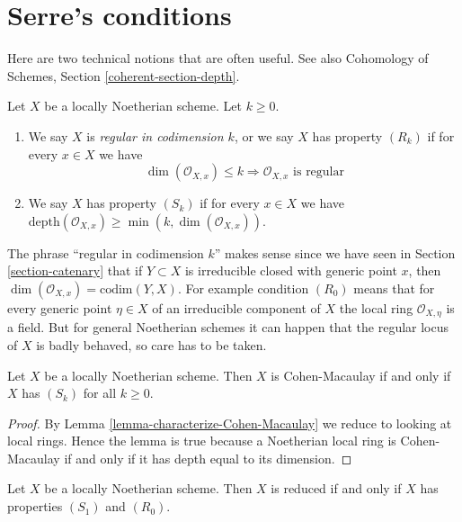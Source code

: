 \section{Serre's conditions}
\label{section-Rk}

\noindent
Here are two technical notions that are often useful.
See also Cohomology of Schemes, Section \ref{coherent-section-depth}.

\begin{definition}
\label{definition-Rk}
Let $X$ be a locally Noetherian scheme. Let $k \geq 0$.
\begin{enumerate}
\item We say $X$ is {\it regular in codimension $k$},
or we say $X$ has property {\it $(R_k)$} if for every $x \in X$
we have
$$
\dim(\mathcal{O}_{X, x}) \leq k
\Rightarrow
\mathcal{O}_{X, x}\text{ is regular}
$$
\item We say $X$ has property {\it $(S_k)$} if for every $x \in X$ we have
$\text{depth}(\mathcal{O}_{X, x}) \geq \min(k, \dim(\mathcal{O}_{X, x}))$.
\end{enumerate}
\end{definition}

\noindent
The phrase ``regular in codimension $k$'' makes sense since we have seen
in Section \ref{section-catenary} that if $Y \subset X$ is irreducible
closed with generic point $x$, then
$\dim(\mathcal{O}_{X, x}) = \text{codim}(Y, X)$. For example condition
$(R_0)$ means that for every generic point $\eta \in X$ of an irreducible
component of $X$ the local ring $\mathcal{O}_{X, \eta}$ is a field.
But for general Noetherian schemes it can happen that the regular locus
of $X$ is badly behaved, so care has to be taken.

\begin{lemma}
\label{lemma-scheme-CM-iff-all-Sk}
Let $X$ be a locally Noetherian scheme.
Then $X$ is Cohen-Macaulay if and only if $X$ has $(S_k)$ for all $k \geq 0$.
\end{lemma}

\begin{proof}
By Lemma \ref{lemma-characterize-Cohen-Macaulay}
we reduce to looking at local rings.
Hence the lemma is true because a Noetherian local ring is Cohen-Macaulay
if and only if it has depth equal to its dimension.
\end{proof}

\begin{lemma}
\label{lemma-criterion-reduced}
Let $X$ be a locally Noetherian scheme.
Then $X$ is reduced if and only if $X$ has properties $(S_1)$ and $(R_0)$.
\end{lemma}

